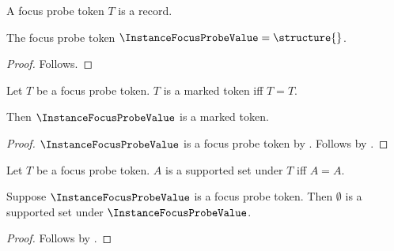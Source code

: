

\begin{struct}\label{instance_focus_probe_token}
    A focus probe token $T$ is a record.
\end{struct}

\begin{instance}\label{instance_focus_probe_value}
    The focus probe token $\InstanceFocusProbeValue=\structure{}$.
\end{instance}
\begin{proof}
    Follows.
\end{proof}

\begin{definition}\label{instance_focus_probe_predicate}
    Let $T$ be a focus probe token.
    $T$ is a marked token iff $T=T$.
\end{definition}

\begin{theorem}\label{instance_focus_probe_subject}
    Then $\InstanceFocusProbeValue$ is a marked token.
\end{theorem}
\begin{proof}
    $\InstanceFocusProbeValue$ is a focus probe token by .
    Follows by .
\end{proof}

\begin{definition}\label{instance_focus_probe_parameter_predicate}
    Let $T$ be a focus probe token.
    $A$ is a supported set under $T$ iff $A=A$.
\end{definition}

\begin{theorem}\label{instance_focus_probe_explicit_guard}
    Suppose $\InstanceFocusProbeValue$ is a focus probe token.
    Then $\emptyset$ is a supported set under $\InstanceFocusProbeValue$.
\end{theorem}
\begin{proof}
    Follows by .
\end{proof}
